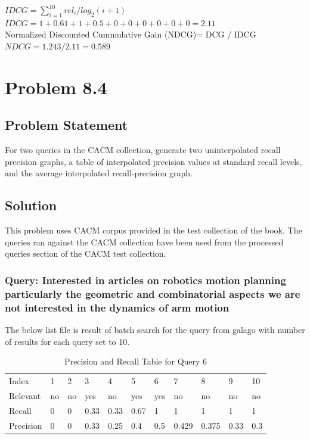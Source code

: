 \documentclass[12pt]{report}
\begin{document}
$IDCG = \sum\limits_{i=1}^{10} rel_i / log_2(i + 1)$ \\
$IDCG = 1 + 0.61 + 1 + 0.5 + 0 + 0 + 0 + 0 + 0 + 0 =  2.11$\\
Normalized Discounted Cummulative Gain (NDCG)=  DCG / IDCG\\
$NDCG = 1.243 / 2.11 = 0.589$

\chapter{Problem 8.4}
\section{Problem Statement}
For two queries in the CACM collection, generate two uninterpolated recall precision graphs, a table of interpolated precision values at standard recall levels, and the average interpolated recall-precision graph.
\section{Solution}
This problem uses CACM corpus provided in the test collection of the book. The queries ran against the CACM collection have been used from the processed queries section of the CACM test collection.\\
\subsection{Query: Interested in articles on robotics  motion planning particularly the geometric and combinatorial aspects   we are not interested in the dynamics of arm motion}

The below list file is result of batch search for the query from galago with number of results for each query set to 10.



\begin{table}[]
\centering
\caption{Precision and Recall Table for Query 6}
\label{my-label}
\begin{tabular}{lllllllllll}
Index     & 1    & 2    & 3    & 4   & 5   & 6    & 7     & 8     & 9    & 10  \\
Relevant  & no  & no   & yes   & no & yes  & yes   & no   & no    & no   & no \\
Recall    & 0 & 0 & 0.33 & 0.33 & 0.67 & 1  & 1  & 1  & 1 & 1   \\
Precision & 0  & 0  & 0.33 & 0.25 & 0.4 & 0.5 & 0.429 & 0.375 & 0.33 & 0.3
\end{tabular}
\end{table}
\end{document}
